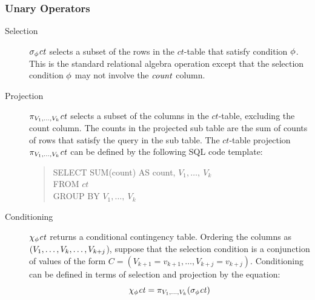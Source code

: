 \documentclass{acm_proc_article-sp}
\newcommand{\ct}{\mathit{ct}}
\begin{document}
\subsubsection{Unary Operators} \label{sec:unary}
\begin{description}
\item[Selection] $\sigma_{\selectcond}  \ct$ selects a subset of the rows in the  $\ct$-table  that satisfy condition $\phi$. This is the standard relational algebra operation except that the selection condition $\phi$ may not involve the $\it{count}$ column.
\item[Projection]  %
$\project_{\V_{1},\ldots,\V_{k}} \ct$ selects a subset of the  columns in the  $\ct$-table, excluding the count column. 
The counts in the projected sub table are the sum of counts of rows that satisfy the query in the sub table. 
The  $\ct$-table projection  $\project_{\V_{1},\ldots,\V_{k}} \ct$ can be defined by the following SQL code template:
\begin{quote}
SELECT SUM(count) AS count, $V_{1}, \ldots,\ V_{k}$ \\
FROM $\ct$ \\
GROUP BY $V_{1}, \ldots,\ V_{k}$
\end{quote}
\item[Conditioning]  $\condition_{\selectcond}  \ct$ returns a conditional contingency table. Ordering the columns as $(V_{1},\ldots,V_{k}, \ldots,V_{k+j}$),  suppose that the selection condition is a conjunction of values of the form $C = (V_{k+1} = v_{k+1},\ldots, V_{k+j} = v_{k+j})$.  Conditioning can be defined in terms of selection and projection by the equation:
\begin{equation}
\condition_{\selectcond}  \ct = \project_{\V_{1},\ldots,\V_{k}} (\select_{\selectcond}  \ct) \nonumber
\end{equation}
\end{description}
\end{document}
